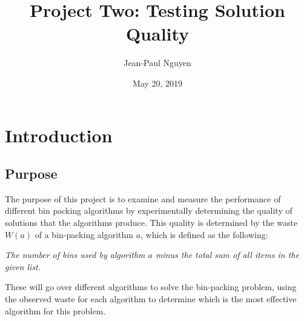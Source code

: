 \documentclass{article}
\title{Project Two: Testing Solution Quality}
\author{Jean-Paul Nguyen}
\date{May 20, 2019}
\begin{document}
\maketitle
\tableofcontents

\newcommand{\nextblurb}[0]{\vspace{1 em} \newline \noindent}

\pagebreak

\section{Introduction}
\subsection{Purpose}
    The purpose of this project is to examine and measure the performance of
    different bin packing algorithms by experimentally determining the quality 
    of solutions that the algorithms produce. This quality is determined by
    the waste $W(a)$ of a bin-packing algorithm $a$, which is defined as the 
    following:
    \begin{center}
        \textit{The number of bins used by algorithm $a$ minus the total sum of 
        all items in the given list.}
    \end{center}
    These will go over different algorithms to solve the bin-packing problem,
    using the observed waste for each algorithm to determine which is the most
    effective algorithm for this problem.
\end{document}
